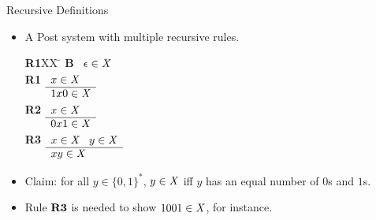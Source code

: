 \documentclass[style=sailor,size=12pt]{powerdot}
\newcommand{\id}[1]{\mbox{\it #1\/}}
\newcommand{\bid}[1]{\mbox{\bf #1}}
\begin{document}
\begin{wideslide}[bm=,toc=]{Recursive Definitions}
\begin{itemize}
\item  A Post system with multiple recursive rules.
\begin{tabbing}
{\bf R1}XX \=  \kill
{\bf B} \>
        \(\begin{array}[t]{l}
        \epsilon \in \id{X}
        \end{array}\) \\[2ex]

{\bf R1} \>
        \(\begin{array}[t]{l}
        x\in \id{X} \\
        \hline
        1x0 \in \id{X}
        \end{array}\) \\[2ex]

{\bf R2} \>
        \(\begin{array}[t]{l}
        x\in \id{X} \\
        \hline
        0x1 \in \id{X}
        \end{array}\) \\[2ex]
       
{\bf R3} \>
        \(\begin{array}[t]{l}
        x \in \id{X} \;\;\;y \in \id{X} \\
        \hline
        xy \in \id{X}
        \end{array}\)
\end{tabbing}
\item Claim: for all $y \in \{0,1\}^*$, $y \in \id{X}$ iff $y$ has an equal
number of $0$s and $1$s.
\item Rule $\bid{R3}$ is needed to show $1001 \in \id{X}$, for instance.
\end{itemize}
\end{wideslide}
\end{document}
